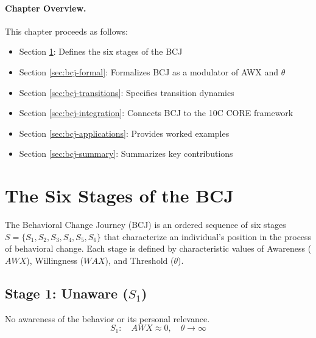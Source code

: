 \paragraph{Chapter Overview.}
This chapter proceeds as follows:
\begin{itemize}
    \item Section \ref{sec:bcj-stages}: Defines the six stages of the BCJ
    \item Section \ref{sec:bcj-formal}: Formalizes BCJ as a modulator of AWX and $\theta$
    \item Section \ref{sec:bcj-transitions}: Specifies transition dynamics
    \item Section \ref{sec:bcj-integration}: Connects BCJ to the 10C CORE framework
    \item Section \ref{sec:bcj-applications}: Provides worked examples
    \item Section \ref{sec:bcj-summary}: Summarizes key contributions
\end{itemize}



\section{The Six Stages of the BCJ}
\label{sec:bcj-stages}


\begin{definition}
The Behavioral Change Journey (BCJ) is an ordered sequence of six stages
$S = \{S_1, S_2, S_3, S_4, S_5, S_6\}$ that characterize an individual's position
in the process of behavioral change. Each stage is defined by characteristic
values of Awareness ($AWX$), Willingness ($WAX$), and Threshold ($\theta$).
\end{definition}

\subsection{Stage 1: Unaware ($S_1$)}
\label{sec:bcj-s1}

\begin{definition}
No awareness of the behavior or its personal relevance.
\begin{equation}
S_1: \quad AWX \approx 0, \quad \theta \to \infty
\end{equation}
\end{definition}

